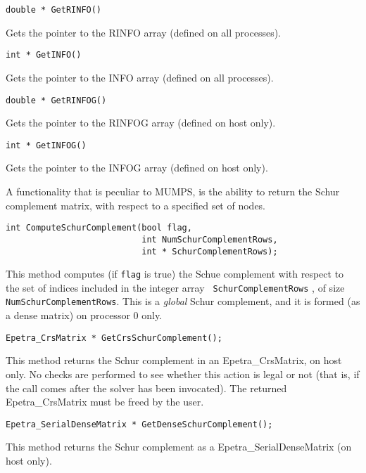 \documentclass[11pt,letter]{article}
\begin{document}
\medskip

\begin{verbatim}
double * GetRINFO() 
\end{verbatim}
Gets the pointer to the RINFO array (defined on all processes).

\medskip

\begin{verbatim}
int * GetINFO() 
\end{verbatim}
Gets the pointer to the INFO array (defined on all processes).

\medskip

\begin{verbatim}
double * GetRINFOG() 
\end{verbatim}
Gets the pointer to the RINFOG array (defined on host only).

\medskip

\begin{verbatim}
int * GetINFOG() 
\end{verbatim}
Gets the pointer to the INFOG array (defined on host only).

\bigskip
  
A functionality that is peculiar to MUMPS, is the ability to return
the Schur complement matrix, with respect to a specified set of nodes.

\begin{verbatim}
int ComputeSchurComplement(bool flag,
                           int NumSchurComplementRows, 
                           int * SchurComplementRows);
\end{verbatim}
This method computes (if \verb!flag! is true) the Schue complement with
respect to the set of indices included in the integer array {\tt
  SchurComplementRows} , of size {\tt NumSchurComplementRows}. This is a
{\sl global} Schur complement, and it is formed (as a dense matrix) on
processor 0 only.

\medskip

\begin{verbatim}
Epetra_CrsMatrix * GetCrsSchurComplement();
\end{verbatim}
This method returns the Schur complement in an Epetra\_CrsMatrix, on host
only. No checks are performed to see whether this action is legal or not
(that is, if the call comes after the solver has been invocated).
The returned Epetra\_CrsMatrix must be freed by the user.

\medskip

\begin{verbatim}
Epetra_SerialDenseMatrix * GetDenseSchurComplement();
\end{verbatim}
This method returns the Schur complement as a Epetra\_SerialDenseMatrix
(on host only).
\end{document}
